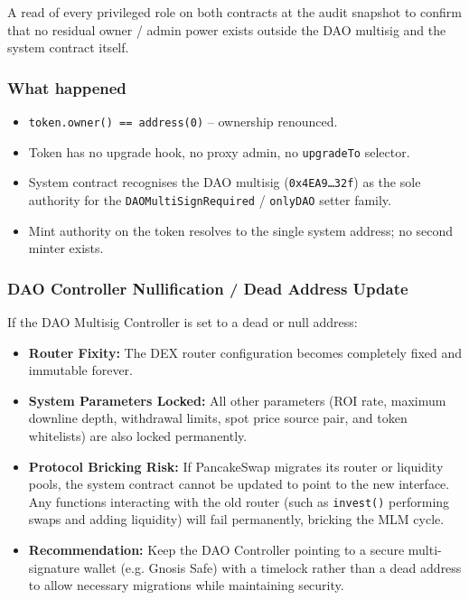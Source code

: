 \documentclass[11pt,a4paper]{article}
\begin{document}
A read of every privileged role on both contracts at the audit snapshot
to confirm that no residual owner / admin power exists outside the DAO
multisig and the system contract itself.

\subsubsection*{What happened}

\begin{itemize}[leftmargin=*]
    \item \texttt{token.owner() == address(0)} -- ownership renounced.
    \item Token has no upgrade hook, no proxy admin, no \texttt{upgradeTo}
          selector.
    \item System contract recognises the DAO multisig
          (\texttt{0x4EA9\dots32f}) as the sole authority for the
          \texttt{DAOMultiSignRequired} / \texttt{onlyDAO} setter family.
    \item Mint authority on the token resolves to the single system address;
          no second minter exists.
\end{itemize}

\subsubsection*{DAO Controller Nullification / Dead Address Update}
If the DAO Multisig Controller is set to a dead or null address:
\begin{itemize}[leftmargin=*]
    \item \textbf{Router Fixity:} The DEX router configuration becomes completely fixed and immutable forever.
    \item \textbf{System Parameters Locked:} All other parameters (ROI rate, maximum downline depth, withdrawal limits, spot price source pair, and token whitelists) are also locked permanently.
    \item \textbf{Protocol Bricking Risk:} If PancakeSwap migrates its router or liquidity pools, the system contract cannot be updated to point to the new interface. Any functions interacting with the old router (such as \texttt{invest()} performing swaps and adding liquidity) will fail permanently, bricking the MLM cycle.
    \item \textbf{Recommendation:} Keep the DAO Controller pointing to a secure multi-signature wallet (e.g. Gnosis Safe) with a timelock rather than a dead address to allow necessary migrations while maintaining security.
\end{itemize}
\end{document}
